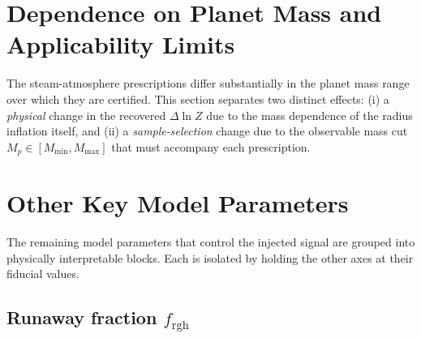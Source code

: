 \section{Dependence on Planet Mass and Applicability Limits}
\label{sec:mass_dependence}

The steam-atmosphere prescriptions differ substantially in the planet
mass range over which they are certified.  This section separates two
distinct effects: (i) a \emph{physical} change in the recovered
$\Delta \ln Z$ due to the mass dependence of the radius inflation itself,
and (ii) a \emph{sample-selection} change due to the observable mass cut
$M_p \in [M_{\min}, M_{\max}]$ that must accompany each prescription.

%
%


\section{Other Key Model Parameters}
\label{sec:other_parameters}

The remaining model parameters that control the injected signal are
grouped into physically interpretable blocks.  Each is isolated by
holding the other axes at their fiducial values.


\subsection{Runaway fraction \texorpdfstring{$f_{\mathrm{rgh}}$}{f\_rgh}}
\label{ssec:f_rgh}

